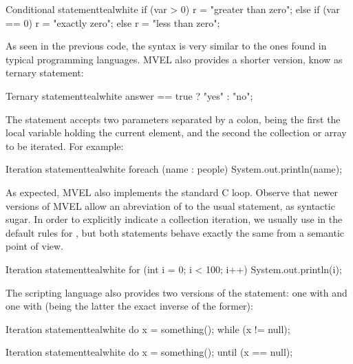 \begin{codebox}{Conditional statement}{teal}{\icnote}{white}
if (var > 0) {
   r = "greater than zero";
}
else if (var == 0) { 
   r = "exactly zero";
}
else { 
   r = "less than zero";
}
\end{codebox}

As seen in the previous code, the syntax is very similar to the ones found in typical programming languages. MVEL also provides a shorter version, know as ternary statement:

\begin{codebox}{Ternary statement}{teal}{\icnote}{white}
answer == true ? "yes" : "no";
\end{codebox}

The  statement accepts two parameters separated by a colon, being the first the local variable holding the current element, and the second the collection or array to be iterated. For example:

\begin{codebox}{Iteration statement}{teal}{\icnote}{white}
foreach (name : people) {
    System.out.println(name);
}
\end{codebox}

As expected, MVEL also implements the standard C  loop. Observe that newer versions of MVEL allow an abreviation of  to the usual  statement, as syntactic sugar. In order to explicitly indicate a collection iteration, we usually use  in the default rules for \arara, but both statements behave exactly the same from a semantic point of view. 

\begin{codebox}{Iteration statement}{teal}{\icnote}{white}
for (int i = 0; i < 100; i++) { 
   System.out.println(i);
}
\end{codebox}

The scripting language also provides two versions of the  statement: one with  and one with  (being the latter the exact inverse of the former):

\begin{codebox}{Iteration statement}{teal}{\icnote}{white}
do {
    x = something();
} while (x != null);
\end{codebox}

\begin{codebox}{Iteration statement}{teal}{\icnote}{white}
do {
   x = something();
} until (x == null);
\end{codebox}


